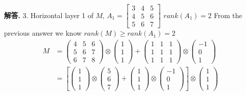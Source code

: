 \documentclass[12pt, a4paper, oneside]{article}
\newenvironment{solution}{\par\noindent\textbf{解答. }}{\par}
\begin{document}
\begin{CJK}{UTF8}{gbsn}
\begin{solution}
  3. \newline
  Horizontal layer 1 of $M$, $A_1=\begin{bmatrix}
    3 & 4 & 5 \\ 4 & 5 & 6 \\ 5 & 6 & 7
  \end{bmatrix}$ \newline
  $rank(A_1) = 2$ \newline
  From the previous answer we know $rank(M)\geq rank(A_1)=2$ \newline
  \begin{align}
    M &= \begin{pmatrix}
      4 & 5 & 6 \\ 
      5 & 6 & 7 \\
      6 & 7 & 8
    \end{pmatrix} \otimes \begin{pmatrix}
      1 \\ 1 \\ 1
    \end{pmatrix} + \begin{pmatrix}
      1 & 1 & 1 \\ 1 & 1 & 1 \\ 1 & 1 & 1
    \end{pmatrix} \otimes \begin{pmatrix}
      -1 \\ 0 \\ 1
    \end{pmatrix} \nonumber \\
    & = \left[\begin{pmatrix}
      1 \\ 1 \\ 1
    \end{pmatrix}\otimes\begin{pmatrix}
      5 \\ 6 \\ 7
    \end{pmatrix}+\begin{pmatrix}
      1 \\ 1 \\ 1
    \end{pmatrix}\otimes\begin{pmatrix}
      -1 \\ 0 \\ 1
    \end{pmatrix}\right]\otimes\begin{pmatrix}
      1 \\ 1 \\ 1

\end{pmatrix}
\end{align}
\end{solution}
\end{CJK}
\end{document}
